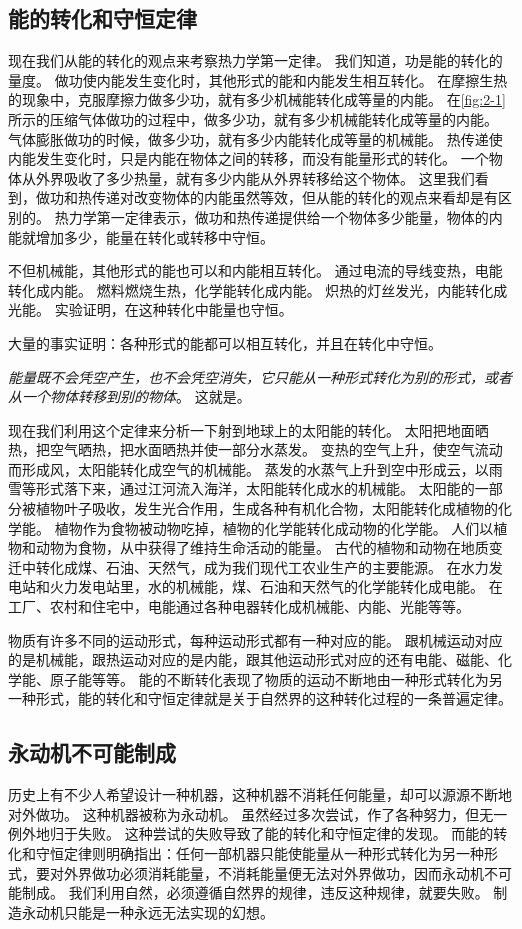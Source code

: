 \subsection{能的转化和守恒定律} 
现在我们从能的转化的观点来考察热力学第一定律。
我们知道，功是能的转化的量度。
做功使内能发生变化时，其他形式的能和内能发生相互转化。
在摩擦生热的现象中，克服摩擦力做多少功，就有多少机械能转化成等量的内能。
在\cref{fig:2-1} 所示的压缩气体做功的过程中，做多少功，就有多少机械能转化成等量的内能。
气体膨胀做功的时候，做多少功，就有多少内能转化成等量的机械能。
热传递使内能发生变化时，只是内能在物体之间的转移，而没有能量形式的转化。
一个物体从外界吸收了多少热量，就有多少内能从外界转移给这个物体。
这里我们看到，做功和热传递对改变物体的内能虽然等效，但从能的转化的观点来看却是有区别的。
热力学第一定律表示，做功和热传递提供给一个物体多少能量，物体的内能就增加多少，能量在转化或转移中守恒。

不但机械能，其他形式的能也可以和内能相互转化。
通过电流的导线变热，电能转化成内能。
燃料燃烧生热，化学能转化成内能。
炽热的灯丝发光，内能转化成光能。
实验证明，在这种转化中能量也守恒。

大量的事实证明：各种形式的能都可以相互转化，并且在转化中守恒。

\emph{能量既不会凭空产生，也不会凭空消失，它只能从一种形式转化为别的形式，或者从一个物体转移到别的物体}。
这就是。

现在我们利用这个定律来分析一下射到地球上的太阳能的转化。
太阳把地面晒热，把空气晒热，把水面晒热并使一部分水蒸发。
变热的空气上升，使空气流动而形成风，太阳能转化成空气的机械能。
蒸发的水蒸气上升到空中形成云，以雨雪等形式落下来，通过江河流入海洋，太阳能转化成水的机械能。
太阳能的一部分被植物叶子吸收，发生光合作用，生成各种有机化合物，太阳能转化成植物的化学能。
植物作为食物被动物吃掉，植物的化学能转化成动物的化学能。
人们以植物和动物为食物，从中获得了维持生命活动的能量。
古代的植物和动物在地质变迁中转化成煤、石油、天然气，成为我们现代工农业生产的主要能源。
在水力发电站和火力发电站里，水的机械能，煤、石油和天然气的化学能转化成电能。
在工厂、农村和住宅中，电能通过各种电器转化成机械能、内能、光能等等。

物质有许多不同的运动形式，每种运动形式都有一种对应的能。
跟机械运动对应的是机械能，跟热运动对应的是内能，跟其他运动形式对应的还有电能、磁能、化学能、原子能等等。
能的不断转化表现了物质的运动不断地由一种形式转化为另一种形式，能的转化和守恒定律就是关于自然界的这种转化过程的一条普遍定律。

\subsection{永动机不可能制成} 
历史上有不少人希望设计一种机器，这种机器不消耗任何能量，却可以源源不断地对外做功。
这种机器被称为永动机。
虽然经过多次尝试，作了各种努力，但无一例外地归于失败。
这种尝试的失败导致了能的转化和守恒定律的发现。
而能的转化和守恒定律则明确指出：任何一部机器只能使能量从一种形式转化为另一种形式，要对外界做功必须消耗能量，不消耗能量便无法对外界做功，因而永动机不可能制成。
我们利用自然，必须遵循自然界的规律，违反这种规律，就要失败。
制造永动机只能是一种永远无法实现的幻想。

